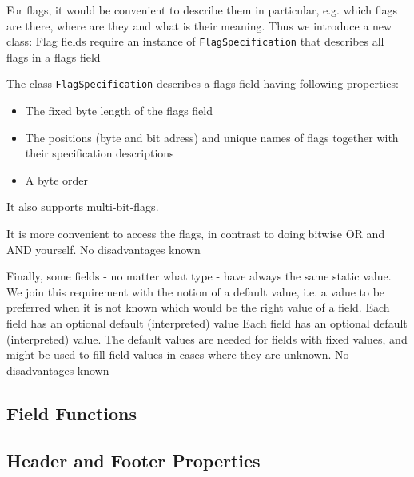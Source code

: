 For flags, it would be convenient to describe them in particular, e.g. which flags are there, where are they and what is their meaning. Thus we introduce a new class:
{%
Flag fields require an instance of \texttt{FlagSpecification} that describes all flags in a flags field
}
{%
The class \texttt{FlagSpecification} describes a flags field having following properties:
\begin{itemize}
\item The fixed byte length of the flags field
\item The positions (byte and bit adress) and unique names of flags together with their specification descriptions 
\item A byte order
\end{itemize}

It also supports multi-bit-flags.
}
{%
It is more convenient to access the flags, in contrast to doing bitwise OR and AND yourself.
}
{%
No disadvantages known
}

Finally, some fields - no matter what type - have always the same static value. We join this requirement with the notion of a default value, i.e. a value to be preferred when it is not known which would be the right value of a field.
{%
Each field has an optional default (interpreted) value
}
{%
Each field has an optional default (interpreted) value.
}
{%
The default values are needed for fields with fixed values, and might be used to fill field values in cases where they are unknown.
}
{%
No disadvantages known
}

\subsection{Field Functions}%
\label{sec:FieldFunctions}%





\subsection{Header and Footer Properties}%
\label{sec:HeaderProperties}%


